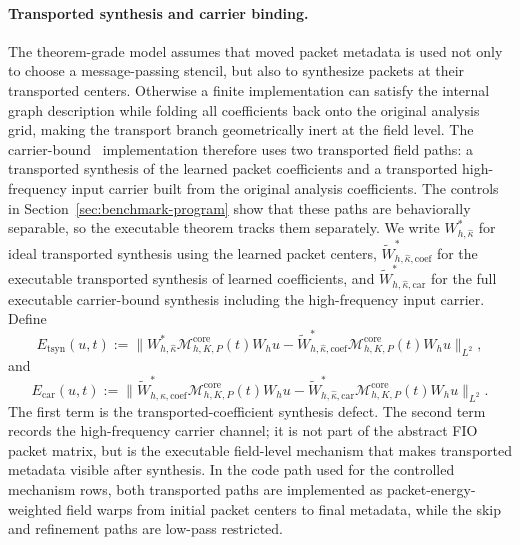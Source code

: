 \paragraph{Transported synthesis and carrier binding.}
The theorem-grade model assumes that moved packet metadata is used not only to choose a message-passing stencil, but also to synthesize packets at their transported centers.  Otherwise a finite implementation can satisfy the internal graph description while folding all coefficients back onto the original analysis grid, making the transport branch geometrically inert at the field level.  The carrier-bound \MiNO\ implementation therefore uses two transported field paths: a transported synthesis of the learned packet coefficients and a transported high-frequency input carrier built from the original analysis coefficients.  The controls in Section~\ref{sec:benchmark-program} show that these paths are behaviorally separable, so the executable theorem tracks them separately.  We write $W_{h,\widehat\kappa}^{\ast}$ for ideal transported synthesis using the learned packet centers, $\widetilde W_{h,\widehat\kappa,\mathrm{coef}}^{\ast}$ for the executable transported synthesis of learned coefficients, and $\widetilde W_{h,\widehat\kappa,\mathrm{car}}^{\ast}$ for the full executable carrier-bound synthesis including the high-frequency input carrier.  Define
\[
E_{\mathrm{tsyn}}(u,t)
:=
\bigl\|
W_{h,\widehat\kappa}^{\ast}\mathcal M_{h,K,P}^{\mathrm{core}}(t)W_hu
-\widetilde W_{h,\widehat\kappa,\mathrm{coef}}^{\ast}\mathcal M_{h,K,P}^{\mathrm{core}}(t)W_hu
\bigr\|_{L^2},
\]
and
\[
E_{\mathrm{car}}(u,t)
:=
\bigl\|
\widetilde W_{h,\widehat\kappa,\mathrm{coef}}^{\ast}\mathcal M_{h,K,P}^{\mathrm{core}}(t)W_hu
-\widetilde W_{h,\widehat\kappa,\mathrm{car}}^{\ast}\mathcal M_{h,K,P}^{\mathrm{core}}(t)W_hu
\bigr\|_{L^2}.
\]
The first term is the transported-coefficient synthesis defect.  The second term records the high-frequency carrier channel; it is not part of the abstract FIO packet matrix, but is the executable field-level mechanism that makes transported metadata visible after synthesis.  In the code path used for the controlled mechanism rows, both transported paths are implemented as packet-energy-weighted field warps from initial packet centers to final metadata, while the skip and refinement paths are low-pass restricted.

